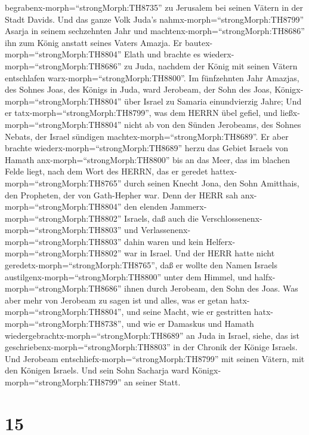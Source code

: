 begrabenx-morph=``strongMorph:TH8735'' zu Jerusalem bei seinen Vätern in
der Stadt Davids.  Und das ganze Volk Juda's
nahmx-morph=``strongMorph:TH8799'' Asarja in seinem sechzehnten Jahr und
machtenx-morph=``strongMorph:TH8686'' ihn zum König anstatt seines
Vaters Amazja.  Er bautex-morph=``strongMorph:TH8804''
Elath und brachte es wiederx-morph=``strongMorph:TH8686'' zu Juda,
nachdem der König mit seinen Vätern entschlafen
warx-morph=``strongMorph:TH8800''.  Im fünfzehnten Jahr
Amazjas, des Sohnes Joas, des Königs in Juda, ward Jerobeam, der Sohn
des Joas, Königx-morph=``strongMorph:TH8804'' über Israel zu Samaria
einundvierzig Jahre;  Und er
tatx-morph=``strongMorph:TH8799'', was dem HERRN übel gefiel, und
ließx-morph=``strongMorph:TH8804'' nicht ab von den Sünden Jerobeams,
des Sohnes Nebats, der Israel sündigen
machtex-morph=``strongMorph:TH8689''.  Er aber brachte
wiederx-morph=``strongMorph:TH8689'' herzu das Gebiet Israels von Hamath
anx-morph=``strongMorph:TH8800'' bis an das Meer, das im blachen Felde
liegt, nach dem Wort des HERRN, das er geredet
hattex-morph=``strongMorph:TH8765'' durch seinen Knecht Jona, den Sohn
Amitthais, den Propheten, der von Gath-Hepher war.  Denn
der HERR sah anx-morph=``strongMorph:TH8804'' den elenden
Jammerx-morph=``strongMorph:TH8802'' Israels, daß auch die
Verschlossenenx-morph=``strongMorph:TH8803'' und
Verlassenenx-morph=``strongMorph:TH8803'' dahin waren und kein
Helferx-morph=``strongMorph:TH8802'' war in Israel.  Und
der HERR hatte nicht geredetx-morph=``strongMorph:TH8765'', daß er
wollte den Namen Israels austilgenx-morph=``strongMorph:TH8800'' unter
dem Himmel, und halfx-morph=``strongMorph:TH8686'' ihnen durch Jerobeam,
den Sohn des Joas.  Was aber mehr von Jerobeam zu sagen ist
und alles, was er getan hatx-morph=``strongMorph:TH8804'', und seine
Macht, wie er gestritten hatx-morph=``strongMorph:TH8738'', und wie er
Damaskus und Hamath wiedergebrachtx-morph=``strongMorph:TH8689'' an Juda
in Israel, siehe, das ist geschriebenx-morph=``strongMorph:TH8803'' in
der Chronik der Könige Israels.  Und Jerobeam
entschliefx-morph=``strongMorph:TH8799'' mit seinen Vätern, mit den
Königen Israels. Und sein Sohn Sacharja ward
Königx-morph=``strongMorph:TH8799'' an seiner Statt.

\hypertarget{section-14}{%
\section{15}\label{section-14}}

